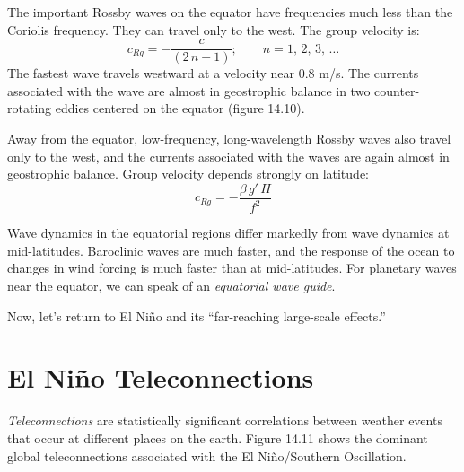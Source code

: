 The important Rossby waves on the equator have
frequencies much less than the Coriolis frequency. They can travel
only to the west. The group velocity is:
\begin{equation}
c_{Rg} = - \frac{c}{\left(2\,n+1\right)}; \qquad n=1,\,2,\,3,\,\ldots
\end{equation}
The fastest wave travels westward at a velocity near 0.8 m/s. The
currents associated with the wave are almost in geostrophic
balance in two
counter-rotating eddies centered on the equator (figure 14.10).

Away from the equator, low-frequency, long-wavelength
Rossby waves also travel only to the west, and the
currents associated with the waves are again almost in geostrophic
balance. Group velocity depends strongly on latitude:
\begin{equation}
c_{Rg} = -\frac{\beta\,g'\,H}{f^2}
\end{equation}

Wave dynamics in the equatorial regions differ markedly from wave
dynamics at mid-latitudes. Baroclinic waves are much faster, and the
response of the ocean to changes in wind forcing is much faster than
at mid-latitudes. For planetary waves near the equator, we can speak
of an \textit{equatorial wave guide}.

Now, let's return to El Ni\~{n}o and its ``far-reaching large-scale
effects.''

\section{El Ni\~{n}o Teleconnections}
\textit{Teleconnections} are statistically significant
correlations between weather e\-vents that occur at different places
on the earth. Figure 14.11 shows the dominant global teleconnections
associated with the El Ni\~{n}o/Southern Oscillation.

